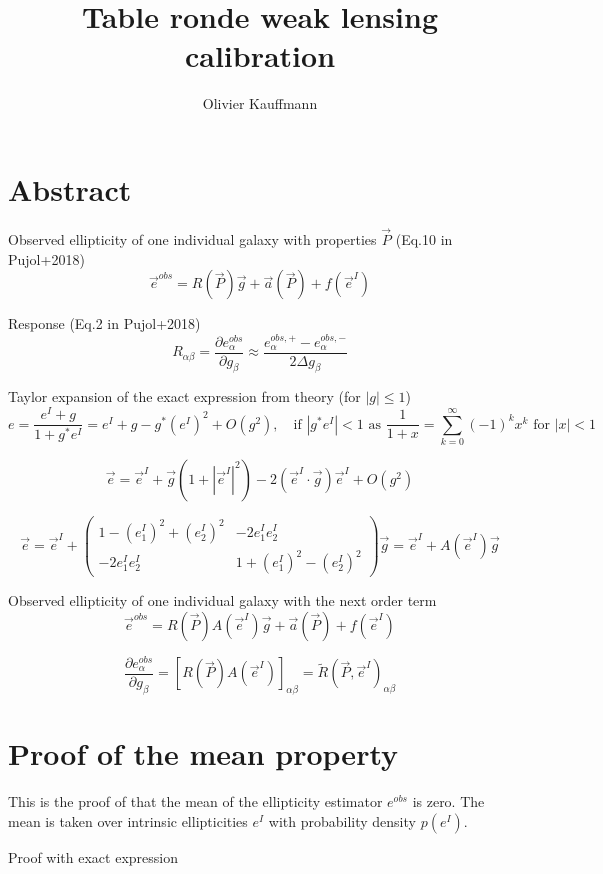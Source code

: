 \documentclass[a4paper]{article}
\title{\vspace{-2cm} Table ronde weak lensing calibration}
\author{Olivier Kauffmann}
\begin{document}
\maketitle



\section{Abstract}

Observed ellipticity of one individual galaxy with properties $\vec{P}$ (Eq.10 in Pujol+2018)
$$
\vec{e}^{obs} = R(\vec{P})\vec{g} +\vec{a}(\vec{P}) + f(\vec{e}^I)
$$

Response (Eq.2 in Pujol+2018)
$$
R_{\alpha\beta} = \dfrac{\partial e_\alpha^{obs}}{\partial g_\beta} \approx \dfrac{e_\alpha^{obs,+}-e_\alpha^{obs,-}}{2\Delta g_\beta}
$$


Taylor expansion of the exact expression from theory (for $|g|\leq1$)
$$
e = \dfrac{e^I+g}{1+g^*e^I} = e^I+g-g^*(e^I)^2 +O(g^2)
,\quad \text{if } |g^*e^I|<1 \text{ as } \dfrac{1}{1+x}=\sum_{k=0}^{\infty}(-1)^kx^k \text{ for } |x|<1 
$$

$$
\vec{e} = \vec{e}^I+\vec{g}(1+|\vec{e}^I|^2)-2(\vec{e}^I\cdot \vec{g})\vec{e}^I +O(g^2)
$$

$$
\vec{e} = \vec{e}^I +
\left(
\begin{array}{cc}
   1-(e_1^I)^2+(e_2^I)^2 & -2e_1^I e_2^I \\
   -2e_1^I e_2^I & 1+(e_1^I)^2-(e_2^I)^2 
\end{array}
\right)
\vec{g}= \vec{e}^I + A(\vec{e}^I)\vec{g}
$$


Observed ellipticity of one individual galaxy with the next order term
$$
\vec{e}^{obs} = R(\vec{P})A(\vec{e}^I)\vec{g} +\vec{a}(\vec{P}) + f(\vec{e}^I)
$$

$$
\dfrac{\partial e_\alpha^{obs}}{\partial g_\beta} = \left[R(\vec{P})A(\vec{e}^I)\right]_{\alpha\beta} = \widetilde{R}(\vec{P},\vec{e}^I)_{\alpha\beta}
$$


\section{Proof of the mean property}

This is the proof of that the mean of the ellipticity estimator $e^{obs}$ is zero. The mean is taken over intrinsic ellipticities $e^I$ with probability density $p(e^I)$.

Proof with exact expression
\end{document}
